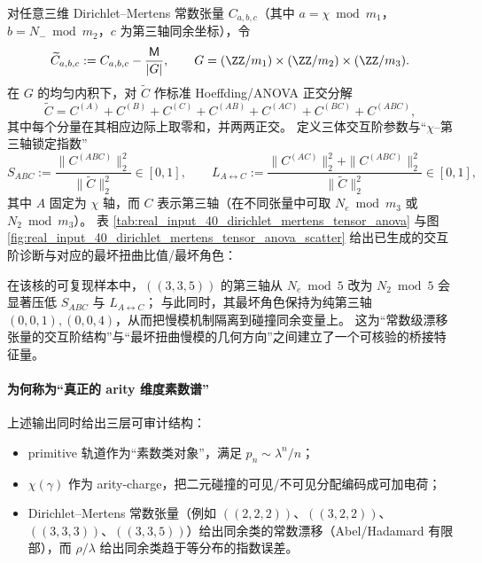 \begin{remark}\label{rem:dirichlet-mertens-anova-fingerprint}
对任意三维 Dirichlet--Mertens 常数张量 \(C_{a,b,c}\)（其中 \(a=\chi\bmod m_1\)，\(b=N_-\bmod m_2\)，\(c\) 为第三轴同余坐标），令
$$
\widetilde C_{a,b,c}:=C_{a,b,c}-\frac{\mathsf{M}}{|G|},
\qquad
G=(\ZZ/m_1)\times(\ZZ/m_2)\times(\ZZ/m_3).
$$
在 \(G\) 的均匀内积下，对 \(\widetilde C\) 作标准 Hoeffding/ANOVA 正交分解
$$
\widetilde C
=C^{(A)}+C^{(B)}+C^{(C)}+C^{(AB)}+C^{(AC)}+C^{(BC)}+C^{(ABC)},
$$
其中每个分量在其相应边际上取零和，并两两正交。
定义三体交互阶参数与“\(\chi\)--第三轴锁定指数”
$$
S_{ABC}:=\frac{\|C^{(ABC)}\|_2^2}{\|\widetilde C\|_2^2}\in[0,1],
\qquad
L_{A\leftrightarrow C}:=\frac{\|C^{(AC)}\|_2^2+\|C^{(ABC)}\|_2^2}{\|\widetilde C\|_2^2}\in[0,1],
$$
其中 \(A\) 固定为 \(\chi\) 轴，而 \(C\) 表示第三轴（在不同张量中可取 \(N_e\bmod m_3\) 或 \(N_2\bmod m_3\)）。
表 \ref{tab:real_input_40_dirichlet_mertens_tensor_anova} 与图 \ref{fig:real_input_40_dirichlet_mertens_tensor_anova_scatter} 给出已生成的交互阶诊断与对应的最坏扭曲比值/最坏角色：


\par
在该核的可复现样本中，\(((3,3,5))\) 的第三轴从 \(N_e\bmod 5\) 改为 \(N_2\bmod 5\) 会显著压低 \(S_{ABC}\) 与 \(L_{A\leftrightarrow C}\)；
与此同时，其最坏角色保持为纯第三轴 \((0,0,1),(0,0,4)\)，从而把慢模机制隔离到碰撞同余变量上。
这为“常数级漂移张量的交互阶结构”与“最坏扭曲慢模的几何方向”之间建立了一个可核验的桥接特征量。
\end{remark}

\paragraph{为何称为“真正的 arity 维度素数谱”}
上述输出同时给出三层可审计结构：
\begin{itemize}
  \item primitive 轨道作为“素数类对象”，满足 $p_n\sim \lambda^n/n$；
\item $\chi(\gamma)$ 作为 arity-charge，把二元碰撞的可见/不可见分配编码成可加电荷；
  \item Dirichlet--Mertens 常数张量（例如 \(((2,2,2))\)、\(((3,2,2))\)、\(((3,3,3))\)、\(((3,3,5))\)）给出同余类的常数漂移（Abel/Hadamard 有限部），而 $\rho/\lambda$ 给出同余类趋于等分布的指数误差。
\end{itemize}
